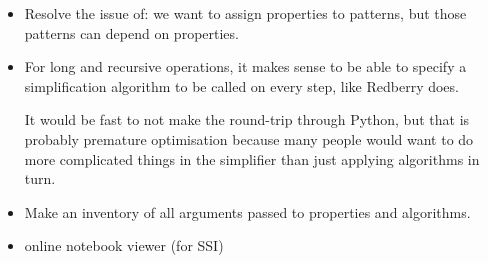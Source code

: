 \documentclass[11pt]{article}
\begin{document}
\begin{itemize}
\item Resolve the issue of: we want to assign properties to patterns, but those patterns can 
depend on properties.

\item For long and recursive operations, it makes sense to be able to specify a simplification
algorithm to be called on every step, like Redberry does.

%      
% 
  
It would be fast to not make the round-trip through Python, but that
is probably premature optimisation because many people would want to
do more complicated things in the simplifier than just applying
algorithms in turn.

\item Make an inventory of all arguments passed to properties and algorithms.

\item online notebook viewer (for SSI)

\end{itemize}
\end{document}
